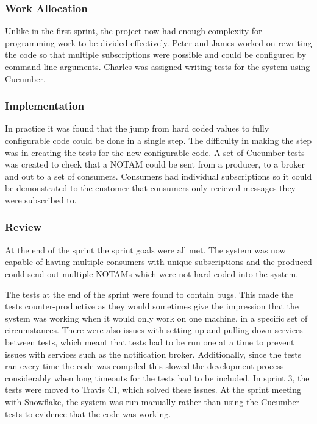 \documentclass[a4paper, 12pt, twoside]{article}
\begin{document}
\subsubsection{Work Allocation}

Unlike in the first sprint, the project now had enough complexity for programming work to be divided effectively. Peter and James worked on rewriting the code so that multiple subscriptions were possible and could be configured by command line arguments. Charles was assigned writing tests for the system using Cucumber.

\subsubsection{Implementation}

In practice it was found that the jump from hard coded values to fully configurable code could be done in a single step. The difficulty in making the step was in creating the tests for the new configurable code. A set of Cucumber tests was created to check that a NOTAM could be sent from a producer, to a broker and out to a set of consumers. Consumers had individual subscriptions so it could be demonstrated to the customer that consumers only recieved messages they were subscribed to.

\subsubsection{Review}

At the end of the sprint the sprint goals were all met. The system was now capable of having multiple consumers with unique subscriptions and the produced could send out multiple NOTAMs which were not hard-coded into the system.

The tests at the end of the sprint were found to contain bugs. This made the tests counter-productive as they would sometimes give the impression that the system was working when it would only work on one machine, in a specific set of circumstances. There were also issues with setting up and pulling down services between tests, which meant that tests had to be run one at a time to prevent issues with services such as the notification broker. Additionally, since the tests ran every time the code was compiled this slowed the development process considerably when long timeouts for the tests had to be included. In sprint 3, the tests were moved to Travis CI, which solved these issues. At the sprint meeting with Snowflake, the system was run manually rather than using the Cucumber tests to evidence that the code was working.
\end{document}
